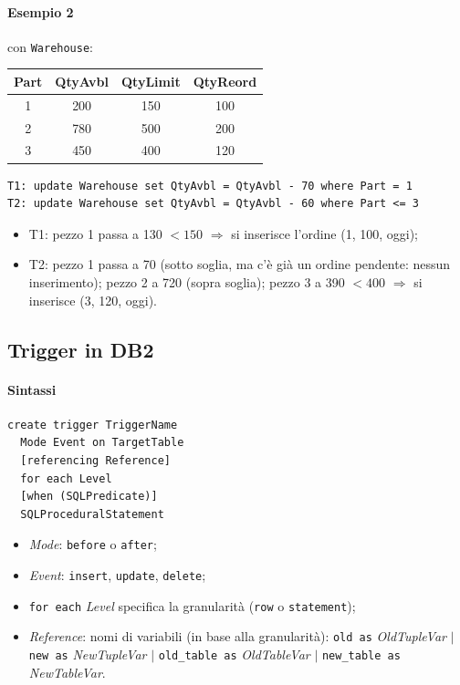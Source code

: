 \documentclass[a4paper,12pt]{article}
\begin{document}
\paragraph{Esempio 2} con \texttt{Warehouse}:
\begin{center}
\begin{tabular}{|c|c|c|c|}
\hline
Part & QtyAvbl & QtyLimit & QtyReord\\ \hline
1 & 200 & 150 & 100\\ 2 & 780 & 500 & 200\\ 3 & 450 & 400 & 120\\ \hline
\end{tabular}
\end{center}
\begin{verbatim}
T1: update Warehouse set QtyAvbl = QtyAvbl - 70 where Part = 1
T2: update Warehouse set QtyAvbl = QtyAvbl - 60 where Part <= 3
\end{verbatim}
\begin{itemize}
  \item T1: pezzo 1 passa a 130 $< 150$ $\Rightarrow$ si inserisce l'ordine
    (1, 100, oggi);
  \item T2: pezzo 1 passa a 70 (sotto soglia, ma c'è già un ordine pendente:
    nessun inserimento); pezzo 2 a 720 (sopra soglia); pezzo 3 a 390 $< 400$
    $\Rightarrow$ si inserisce (3, 120, oggi).
\end{itemize}

\subsection{Trigger in DB2}

\paragraph{Sintassi}
\begin{verbatim}
create trigger TriggerName
  Mode Event on TargetTable
  [referencing Reference]
  for each Level
  [when (SQLPredicate)]
  SQLProceduralStatement
\end{verbatim}
\begin{itemize}
  \item \emph{Mode}: \texttt{before} o \texttt{after};
  \item \emph{Event}: \texttt{insert}, \texttt{update}, \texttt{delete};
  \item \texttt{for each} \emph{Level} specifica la granularità
    (\texttt{row} o \texttt{statement});
  \item \emph{Reference}: nomi di variabili (in base alla granularità):
    \texttt{old as} \emph{OldTupleVar} $|$ \texttt{new as}
    \emph{NewTupleVar} $|$ \texttt{old\_table as} \emph{OldTableVar} $|$
    \texttt{new\_table as} \emph{NewTableVar}.
\end{itemize}
\end{document}
